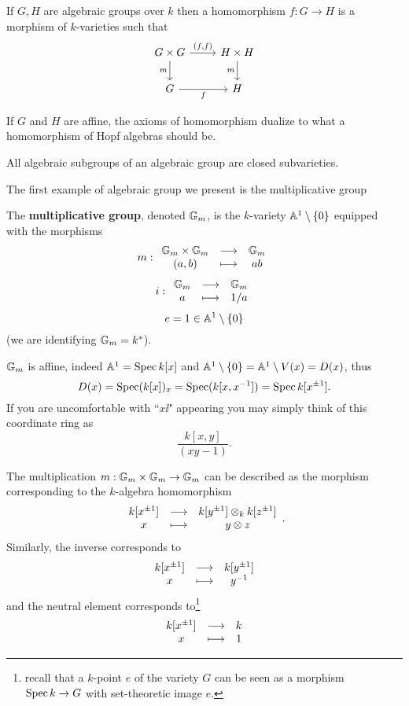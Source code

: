 \begin{definition}
If $G,H$ are algebraic groups over $k$ then a homomorphism $f:G\to H$ is a morphism of $k$-varieties such that
\[\begin{tikzcd}
	{G\times G} & {H\times H} \\
	G & H
	\arrow["{(f,f)}", from=1-1, to=1-2]
	\arrow["m"', from=1-1, to=2-1]
	\arrow["m"', from=1-2, to=2-2]
	\arrow["f"', from=2-1, to=2-2]
\end{tikzcd}\]
\end{definition}

\begin{remark}
If $G$ and $H$ are affine, the axioms of homomorphism dualize to what a homomorphism of Hopf algebras should be.
\end{remark}

\begin{remark}
All algebraic subgroups of an algebraic group are closed subvarieties.
\end{remark}

\bigskip

\begin{center}
	The first example of algebraic group we present is the multiplicative group
\end{center}


\begin{definition}
The \textbf{multiplicative group}, denoted $\mathbb{G}_m$, is the $k$-variety $\mathbb{A}^1\setminus \left\{{0}\right\}$ equipped with the morphisms
\[m:\begin{array}{ccc} {\mathbb{G}_m\times \mathbb{G}_m} & \longrightarrow & {\mathbb{G}_m}\\ {(a,b)} & \longmapsto & {ab} \end{array}\]
\[i:\begin{array}{ccc} {\mathbb{G}_m} & \longrightarrow & {\mathbb{G}_m}\\ {a} & \longmapsto & {1/a} \end{array}\]
\[e=1\in \mathbb{A}^1\setminus\{0\}\]
(we are identifying $\mathbb{G}_m=k^\ast$).
\end{definition}

\begin{remark}
$\mathbb{G}_m$ is affine, indeed $\mathbb{A}^1=\operatorname{Spec} k[x]$ and $\mathbb{A}^1\setminus\{0\}=\mathbb{A}^1\setminus V(x)=D(x)$, thus 
\[D(x)=\operatorname{Spec} (k[x])_{x}=\operatorname{Spec}(k[x,x^{-1}])=\operatorname{Spec} k[x^{\pm1}].\]
If you are uncomfortable with ``$x\ii$" appearing you may simply think of this coordinate ring as
\[\frac{k[x,y]}{(xy-1)}.\]
\end{remark}




\begin{remark}
The multiplication $m:\mathbb{G}_m\times \mathbb{G}_m\to \mathbb{G}_m$ can be described as the morphism corresponding to the $k$-algebra homomorphism
\[\begin{array}{ccc} {k[x^{\pm1}]} & \longrightarrow & {k[y^{\pm1}]\otimes_k k[z^{\pm1}]}\\ {x} & \longmapsto & {y\otimes z} \end{array}.\]
Similarly, the inverse corresponds to
\[\begin{array}{ccc} {k[x^{\pm1}]} & \longrightarrow & {k[y^{\pm1}]}\\ {x} & \longmapsto & {y^{-1}} \end{array}\]
and the neutral element corresponds to\footnote{recall that a $k$-point $e$ of the variety $G$ can be seen as a morphism $\operatorname{Spec} k\to G$ with set-theoretic image $e$.}
\[\begin{array}{ccc} {k[x^{\pm1}]} & \longrightarrow & {k}\\ {x} & \longmapsto & {1} \end{array}\]
\end{remark}





